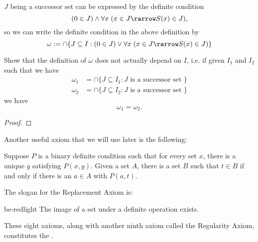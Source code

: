 \documentclass[notoc,notitlepage]{tufte-book}
\begin{document}
\begin{note}
  $J$ being a successor set can be expressed by the definite condition
  \begin{equation*}
    ( 0 \in J ) \land \forall x \; ( x \in J \rarrow S(x) \in J ),
  \end{equation*}
  so we can write the definite condition in the above definition by
  \begin{equation*}
    \omega := \cap \{ J \subseteq I : ( 0 \in J ) \lor \forall x \; ( x \in J \rarrow S(x) \in J ) \}
  \end{equation*}
\end{note}

\begin{ex}
  Show that the definition of $\omega$ does not actually depend on $I$, i.e. if given $I_1$ and $I_2$ such that we have
  \begin{align*}
    \omega_1 &= \cap \{ J \subseteq I_1 : J \text{ is a successor set } \} \\
    \omega_2 &= \cap \{ J \subseteq I_2 : J \text{ is a successor set } \}
  \end{align*}
  we have
  \begin{equation*}
    \omega_1 = \omega_2.
  \end{equation*}
\end{ex}

\begin{proof}
\end{proof}

Another useful axiom that we will use later is the following:

\begin{axiom}
\label{axiom:replacement_axiom}
  Suppose $P$ is a binary definite condition such that for every set $x$, there is a unique $y$ satisfying $P(x, y)$. Given a set $A$, there is a set $B$ such that $t \in B$ if and only if there is an $a \in A$ with $P(a, t)$.
\end{axiom}

\begin{note}
  The slogan for the Replacement Axiom is:
  \begin{quotebox}{be-red}{light}
    The image of a set under a definite operation exists.
  \end{quotebox}
\end{note}

These eight axioms, along with another ninth axiom called the Regularity Axiom, constitutes the .
\end{document}
